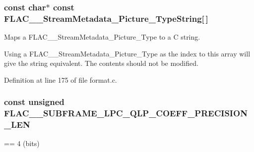 \subsubsection[{\texorpdfstring{F\+L\+A\+C\+\_\+\+\_\+\+Stream\+Metadata\+\_\+\+Picture\+\_\+\+Type\+String}{FLAC__StreamMetadata_Picture_TypeString}}]{ {\bf const} char$\ast$ {\bf const} F\+L\+A\+C\+\_\+\+\_\+\+Stream\+Metadata\+\_\+\+Picture\+\_\+\+Type\+String\mbox{[}$\,$\mbox{]}}\hypertarget{group__flac__format_gaddee484e4ef594f23402072a950e00fd}{}\label{group__flac__format_gaddee484e4ef594f23402072a950e00fd}
Maps a F\+L\+A\+C\+\_\+\+\_\+\+Stream\+Metadata\+\_\+\+Picture\+\_\+\+Type to a C string.

Using a F\+L\+A\+C\+\_\+\+\_\+\+Stream\+Metadata\+\_\+\+Picture\+\_\+\+Type as the index to this array will give the string equivalent. The contents should not be modified. 

Definition at line 175 of file format.\+c.

\subsubsection[{\texorpdfstring{F\+L\+A\+C\+\_\+\+\_\+\+S\+U\+B\+F\+R\+A\+M\+E\+\_\+\+L\+P\+C\+\_\+\+Q\+L\+P\+\_\+\+C\+O\+E\+F\+F\+\_\+\+P\+R\+E\+C\+I\+S\+I\+O\+N\+\_\+\+L\+EN}{FLAC__SUBFRAME_LPC_QLP_COEFF_PRECISION_LEN}}]{ {\bf const} unsigned F\+L\+A\+C\+\_\+\+\_\+\+S\+U\+B\+F\+R\+A\+M\+E\+\_\+\+L\+P\+C\+\_\+\+Q\+L\+P\+\_\+\+C\+O\+E\+F\+F\+\_\+\+P\+R\+E\+C\+I\+S\+I\+O\+N\+\_\+\+L\+EN}\hypertarget{group__flac__format_ga1d983d775b492e968719457694737116}{}\label{group__flac__format_ga1d983d775b492e968719457694737116}
== 4 (bits) 

